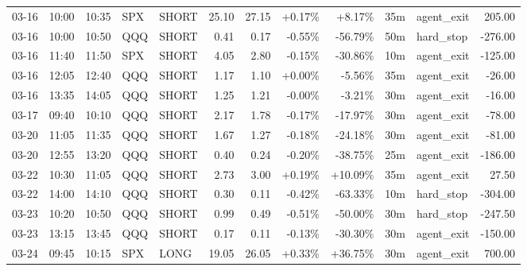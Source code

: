 \documentclass[11pt,a4paper,twoside]{article}
\begin{document}
\begin{center}
\begin{longtable}{>{\color{txtmain}}l l l l l r r r r r >{\color{txtmain}}l r}
03-16 & 10:00 & 10:35 & SPX & SHORT & 25.10 & 27.15 & \textcolor{wingreen}{+0.17\%} & \textcolor{wingreen}{+8.17\%} & 35m & agent\_exit & \textcolor{wingreen}{205.00} \\
03-16 & 10:00 & 10:50 & QQQ & SHORT & 0.41 & 0.17 & \textcolor{lossred}{-0.55\%} & \textcolor{lossred}{-56.79\%} & 50m & hard\_stop & \textcolor{lossred}{-276.00} \\
03-16 & 11:40 & 11:50 & SPX & SHORT & 4.05 & 2.80 & \textcolor{lossred}{-0.15\%} & \textcolor{lossred}{-30.86\%} & 10m & agent\_exit & \textcolor{lossred}{-125.00} \\
03-16 & 12:05 & 12:40 & QQQ & SHORT & 1.17 & 1.10 & \textcolor{wingreen}{+0.00\%} & \textcolor{lossred}{-5.56\%} & 35m & agent\_exit & \textcolor{lossred}{-26.00} \\
03-16 & 13:35 & 14:05 & QQQ & SHORT & 1.25 & 1.21 & \textcolor{wingreen}{-0.00\%} & \textcolor{lossred}{-3.21\%} & 30m & agent\_exit & \textcolor{lossred}{-16.00} \\
03-17 & 09:40 & 10:10 & QQQ & SHORT & 2.17 & 1.78 & \textcolor{lossred}{-0.17\%} & \textcolor{lossred}{-17.97\%} & 30m & agent\_exit & \textcolor{lossred}{-78.00} \\
03-20 & 11:05 & 11:35 & QQQ & SHORT & 1.67 & 1.27 & \textcolor{lossred}{-0.18\%} & \textcolor{lossred}{-24.18\%} & 30m & agent\_exit & \textcolor{lossred}{-81.00} \\
03-20 & 12:55 & 13:20 & QQQ & SHORT & 0.40 & 0.24 & \textcolor{lossred}{-0.20\%} & \textcolor{lossred}{-38.75\%} & 25m & agent\_exit & \textcolor{lossred}{-186.00} \\
03-22 & 10:30 & 11:05 & QQQ & SHORT & 2.73 & 3.00 & \textcolor{wingreen}{+0.19\%} & \textcolor{wingreen}{+10.09\%} & 35m & agent\_exit & \textcolor{wingreen}{27.50} \\
03-22 & 14:00 & 14:10 & QQQ & SHORT & 0.30 & 0.11 & \textcolor{lossred}{-0.42\%} & \textcolor{lossred}{-63.33\%} & 10m & hard\_stop & \textcolor{lossred}{-304.00} \\
03-23 & 10:20 & 10:50 & QQQ & SHORT & 0.99 & 0.49 & \textcolor{lossred}{-0.51\%} & \textcolor{lossred}{-50.00\%} & 30m & hard\_stop & \textcolor{lossred}{-247.50} \\
03-23 & 13:15 & 13:45 & QQQ & SHORT & 0.17 & 0.11 & \textcolor{lossred}{-0.13\%} & \textcolor{lossred}{-30.30\%} & 30m & agent\_exit & \textcolor{lossred}{-150.00} \\
03-24 & 09:45 & 10:15 & SPX & LONG & 19.05 & 26.05 & \textcolor{wingreen}{+0.33\%} & \textcolor{wingreen}{+36.75\%} & 30m & agent\_exit & \textcolor{wingreen}{700.00} \\

\end{longtable}
\end{center}
\end{document}
